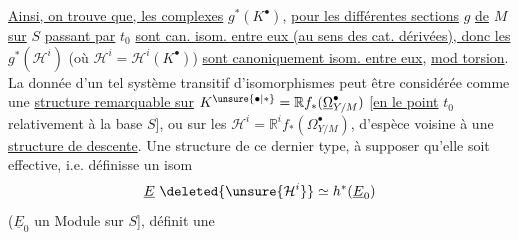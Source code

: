 \uline{Ainsi, on trouve que,  les complexes} $g^*(K^\bullet)$, \uline{pour les différentes sections} $g$ \uline{de} $M$ \uline{sur} $S$ \uline{passant par} $t_0$ \uline{sont can. isom. entre eux (au sens des cat. dérivées), donc les} $g^*(\mathcal{H}^i)$
(où $\mathcal{H}^i=\mathcal{H}^i(K^\bullet)$)
\uline{sont canoniquement isom. entre eux},  \uline{mod torsion}.
La donnée d'un tel système transitif d'isomorphismes peut être considérée comme une \uline{structure remarquable sur} $K^{\unsure{\bullet|*}}=\mathbb{R}f_*(\underline{\Omega}^\bullet_{Y/M})$ [\uline{en le point} $t_0$ relativement à la base $S$], ou sur les $\mathcal{H}^i=\mathbb{R}^if_*(\Omega^\bullet_{Y/M})$,
d'espèce voisine à une \uline{structure de descente}.
Une structure de  ce dernier type,  à supposer qu'elle soit effective, i.e. définisse un isom
\[
\underline{E}\ \deleted{\unsure{\mathcal{H}^i}}\simeq h^*(\underline{E}_0)
\]
($\underline{E}_0$ un Module sur $S$], définit une

